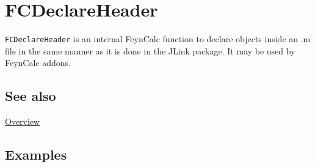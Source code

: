 \documentclass[../FeynCalcManual.tex]{subfiles}
\begin{document}
\hypertarget{fcdeclareheader}{%
\section{FCDeclareHeader}\label{fcdeclareheader}}

\texttt{FCDeclareHeader} is an internal FeynCalc function to declare
objects inside an .m file in the same manner as it is done in the JLink
package. It may be used by FeynCalc addons.

\subsection{See also}

\hyperlink{toc}{Overview}

\subsection{Examples}
\end{document}
